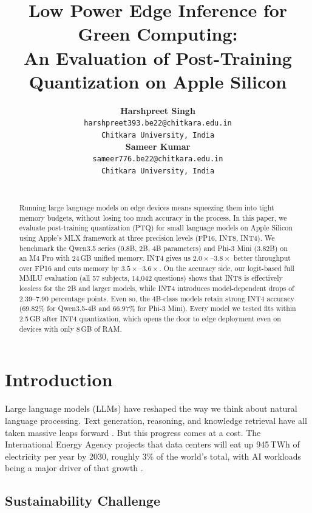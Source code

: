 \documentclass[11pt,a4paper]{article}
\title{\bfseries\Large Low Power Edge Inference for Green Computing: \\
An Evaluation of Post-Training Quantization on Apple Silicon}
\author{
  \small
  \begin{minipage}{0.42\textwidth}
    \centering
    \textbf{\normalsize Harshpreet Singh} \\[3pt]
    \texttt{harshpreet393.be22@chitkara.edu.in} \\
    \texttt{Chitkara University, India}
  \end{minipage}
  \hfill
  \begin{minipage}{0.42\textwidth}
    \centering
    \textbf{\normalsize Sameer Kumar} \\[3pt]
    \texttt{sameer776.be22@chitkara.edu.in} \\
    \texttt{Chitkara University, India}
  \end{minipage}
  \\[6pt]
}
\date{}
\begin{document}
\maketitle

\begin{abstract}
\noindent Running large language models on edge devices means squeezing them into tight memory budgets, without losing too much accuracy in the process. In this paper, we evaluate post-training quantization (PTQ) for small language models on Apple Silicon using Apple's MLX framework at three precision levels (FP16, INT8, INT4). We benchmark the Qwen3.5 series (0.8B, 2B, 4B parameters) and Phi-3 Mini (3.82B) on an M4 Pro with 24\,GB unified memory. INT4 gives us $2.0\times$--$3.8\times$ better throughput over FP16 and cuts memory by $3.5\times$--$3.6\times$. On the accuracy side, our logit-based full MMLU evaluation (all 57 subjects, 14,042 questions) shows that INT8 is effectively lossless for the 2B and larger models, while INT4 introduces model-dependent drops of 2.39--7.90 percentage points. Even so, the 4B-class models retain strong INT4 accuracy (69.82\% for Qwen3.5-4B and 66.97\% for Phi-3 Mini). Every model we tested fits within 2.5\,GB after INT4 quantization, which opens the door to edge deployment even on devices with only 8\,GB of RAM.
\end{abstract}

\section{Introduction}

Large language models (LLMs) have reshaped the way we think about natural language processing. Text generation, reasoning, and knowledge retrieval have all taken massive leaps forward \cite{brown2020language, openai2023gpt4}. But this progress comes at a cost. The International Energy Agency projects that data centers will eat up 945\,TWh of electricity per year by 2030, roughly 3\% of the world's total, with AI workloads being a major driver of that growth \cite{iea2025energyai}.

\subsection{Sustainability Challenge}
\end{document}

